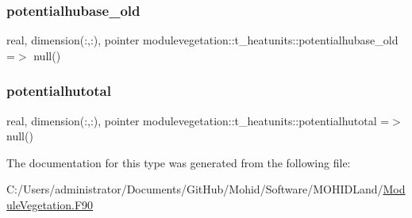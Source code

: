 \mbox{\label{structmodulevegetation_1_1t__heatunits_ac9b991b947641618de639b5af6dcdcc9}} 
\subsubsection{\texorpdfstring{potentialhubase\+\_\+old}{potentialhubase\_old}}
{\footnotesize\ttfamily real, dimension(\+:,\+:), pointer modulevegetation\+::t\+\_\+heatunits\+::potentialhubase\+\_\+old =$>$ null()\hspace{0.3cm}{\ttfamily [private]}}

\mbox{\label{structmodulevegetation_1_1t__heatunits_a1611f68cf8eb8d9aced1fd74c77b51b8}} 
\subsubsection{\texorpdfstring{potentialhutotal}{potentialhutotal}}
{\footnotesize\ttfamily real, dimension(\+:,\+:), pointer modulevegetation\+::t\+\_\+heatunits\+::potentialhutotal =$>$ null()\hspace{0.3cm}{\ttfamily [private]}}



The documentation for this type was generated from the following file\+:\begin{DoxyCompactItemize}
\item 
C\+:/\+Users/administrator/\+Documents/\+Git\+Hub/\+Mohid/\+Software/\+M\+O\+H\+I\+D\+Land/\mbox{\hyperlink{_module_vegetation_8_f90}{Module\+Vegetation.\+F90}}\end{DoxyCompactItemize}
